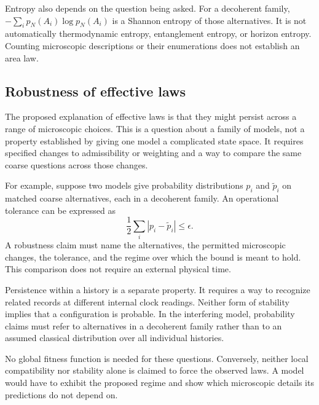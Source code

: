 Entropy also depends on the question being asked. For a decoherent family,
$-\sum_i p_N(A_i)\log p_N(A_i)$ is a Shannon entropy of those alternatives.
It is not automatically thermodynamic entropy, entanglement entropy, or
horizon entropy. Counting microscopic descriptions or their enumerations
does not establish an area law.



\subsection{Robustness of effective laws}
\label{sec:robustness}

The proposed explanation of effective laws is that they might persist
across a range of microscopic choices. This is a question about a family
of models, not a property established by giving one model a complicated
state space. It requires specified changes to admissibility or weighting
and a way to compare the same coarse questions across those changes.

For example, suppose two models give probability distributions $p_i$ and
$\widetilde p_i$ on matched coarse alternatives, each in a decoherent
family. An operational tolerance can be expressed as
\[
  \frac12\sum_i |p_i-\widetilde p_i|\leq\epsilon.
\]
A robustness claim must name the alternatives, the permitted microscopic
changes, the tolerance, and the regime over which the bound is meant to
hold. This comparison does not require an external physical time.

Persistence within a history is a separate property. It requires a way to
recognize related records at different internal clock readings. Neither
form of stability implies that a configuration is probable. In the
interfering model, probability claims must refer to alternatives in a
decoherent family rather than to an assumed classical distribution over
all individual histories.

No global fitness function is needed for these questions. Conversely,
neither local compatibility nor stability alone is claimed to force the
observed laws. A model would have to exhibit the proposed regime and show
which microscopic details its predictions do not depend on.

